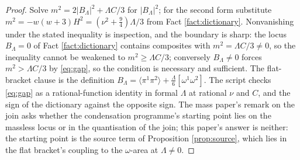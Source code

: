 \documentclass[11pt]{article}
\theoremstyle{definition}
\newcommand{\br}[1]{\langle #1\rangle}
\begin{document}
\begin{proof}
Solve $m^{2} = 2|B_{\Lambda}|^{2} + \Lambda C/3$ for $|B_{\Lambda}|^{2}$; for the second form substitute $m^{2} = -w(w+3)H^{2} = (\nu^{2} + \tfrac94)\Lambda/3$ from Fact \ref{fact:dictionary}. Nonvanishing under the stated inequality is inspection, and the boundary is sharp: the locus $B_{\Lambda} = 0$ of Fact \ref{fact:dictionary} contains composites with $m^{2} = \Lambda C/3 \ne 0$, so the inequality cannot be weakened to $m^{2} \ge \Lambda C/3$; conversely $B_{\Lambda} \ne 0$ forces $m^{2} > \Lambda C/3$ by \eqref{eq:gap}, so the condition is necessary and sufficient. The flat-bracket clause is the definition $B_{\Lambda} = \br{\pi^{1}\pi^{2}} + \tfrac{\Lambda}{6}[\omega^{1}\omega^{2}]$. The script checks \eqref{eq:gap} as a rational-function identity in formal $\Lambda$ at rational $\nu$ and $C$, and the sign of the dictionary against the opposite sign. The mass paper's remark on the join \cite[Rem.~5.10]{ButlerT11} asks whether the condensation programme's starting point lies on the massless locus or in the quantisation of the join; this paper's answer is neither: the starting point is the source term of Proposition \ref{prop:source}, which lies in the flat bracket's coupling to the $\omega$-area at $\Lambda \ne 0$.
\end{proof}
\end{document}
